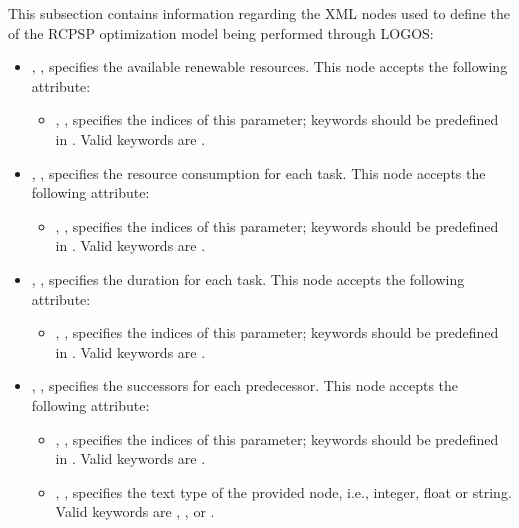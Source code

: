 This subsection contains information regarding the XML nodes used to define the
 of the RCPSP optimization model being performed through LOGOS:
\begin{itemize}
  \item {}, ,
  specifies the available renewable resources. This node accepts the
  following attribute:
  \begin{itemize}
    \item {}, ,
    specifies the indices of this parameter; keywords should be predefined in .
    Valid keywords are .
  \end{itemize}
  \item {}, ,
  specifies the resource consumption for each task. This node accepts the
  following attribute:
  \begin{itemize}
    \item {}, ,
    specifies the indices of this parameter; keywords should be predefined in .
    Valid keywords are .
  \end{itemize}
  \item {}, ,
  specifies the duration for each task.
  This node accepts the following attribute:
  \begin{itemize}
    \item {}, ,
    specifies the indices of this parameter; keywords should be predefined in .
    Valid keywords are .
  \end{itemize}
  \item {}, ,
  specifies the successors for each predecessor.
  This node accepts the following attribute:
  \begin{itemize}
    \item {}, ,
    specifies the indices of this parameter; keywords should be predefined in .
    Valid keywords are .
    \item {}, ,
    specifies the text type of the provided node, i.e., integer, float or string.
    Valid keywords are , , or .
  \end{itemize}
\end{itemize}

